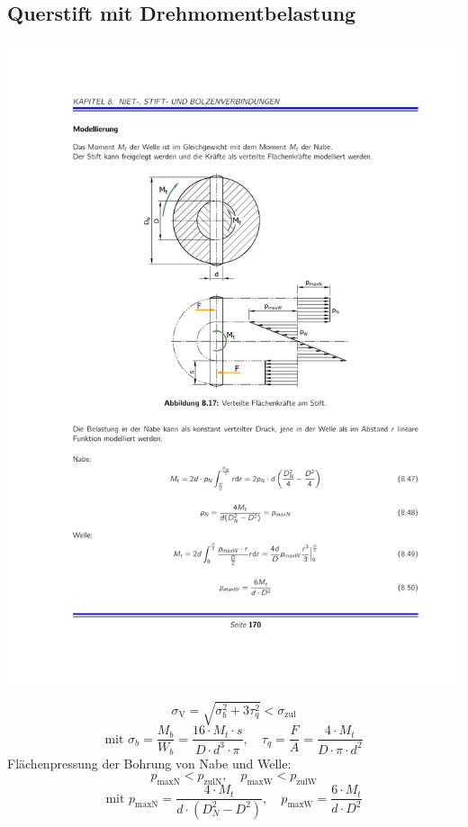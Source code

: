	\subsection{Querstift mit Drehmomentbelastung} %
		\begin{center}
			\includegraphics[width=.8\columnwidth]{graphics/querstift_drehmom}
		\end{center}
		\begin{equation*}
			\sigma_{\text{V}} = \sqrt{\sigma_b^2 + 3 \tau_q^2} < \sigma_{\text{zul}}
		\end{equation*}
		\begin{equation*}
			\text{mit } \sigma_b = \frac{M_b}{W_b}= \frac{16 \cdot M_t \cdot s}{D \cdot d^3 \cdot \pi}, \quad \tau_q = \frac{F}{A} = \frac{4 \cdot M_t}{D \cdot \pi \cdot d^2}
		\end{equation*}
		Flächenpressung der Bohrung von Nabe und Welle:
		\begin{equation*}
			p_{\text{maxN}} < p_{\text{zulN}}, \quad p_{\text{maxW}}< p_{\text{zulW}}
		\end{equation*}
		\begin{equation*}
			\text{mit } p_{\text{maxN}} = \frac{4 \cdot M_t}{d \cdot (D_N^2 - D^2)}, \quad p_{\text{maxW}} = \frac{6 \cdot M_t}{d \cdot D^2}
		\end{equation*}
